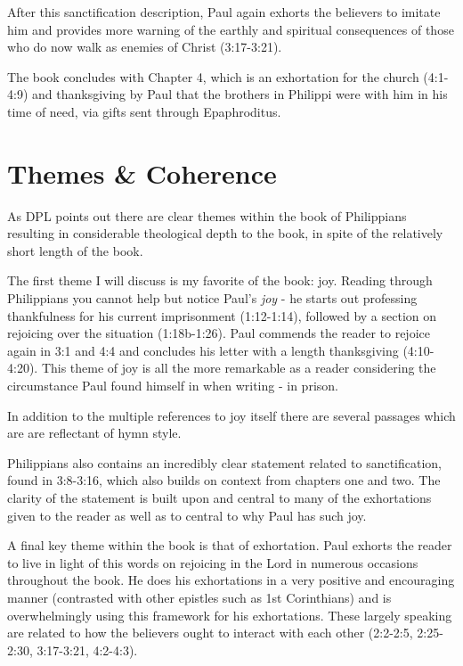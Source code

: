\documentclass[12pt]{turabian-researchpaper}
\begin{document}
After this sanctification description, Paul again exhorts the believers to imitate him and provides more warning of the earthly and spiritual consequences of those who do now walk as enemies of Christ (3:17-3:21).

The book concludes with Chapter 4, which is an exhortation for the church (4:1-4:9) and thanksgiving by Paul that the brothers in Philippi were with him in his time of need, via gifts sent through Epaphroditus.

\section{Themes \& Coherence}

As DPL points out there are clear themes within the book of Philippians resulting in considerable theological depth to the book, in spite of the relatively short length of the book.\autocite[pg. 712]{hawthorne2009dictionary}

The first theme I will discuss is my favorite of the book: joy. Reading through Philippians you cannot help but notice Paul's \textit{joy} - he starts out professing thankfulness for his current imprisonment (1:12-1:14), followed by a section on rejoicing over the situation (1:18b-1:26). Paul commends the reader to rejoice again in 3:1 and 4:4 and concludes his letter with a length thanksgiving (4:10-4:20). This theme of joy is all the more remarkable as a reader considering the circumstance Paul found himself in when writing - in prison.

In addition to the multiple references to joy itself there are several passages which are are reflectant of hymn style.\autocite{hawthorne2009dictionary}

Philippians also contains an incredibly clear statement related to sanctification, found in 3:8-3:16\autocite[pg. 713]{hawthorne2009dictionary}, which also builds on context from chapters one and two. The clarity of the statement is built upon and central to many of the exhortations given to the reader as well as to central to why Paul has such joy.

A final key theme within the book is that of exhortation. Paul exhorts the reader to live in light of this words on rejoicing in the Lord in numerous occasions throughout the book. He does his exhortations in a very positive and encouraging manner (contrasted with other epistles such as 1st Corinthians) and is overwhelmingly using this framework for his exhortations. These largely speaking are related to how the believers ought to interact with each other (2:2-2:5, 2:25-2:30, 3:17-3:21, 4:2-4:3). 
\end{document}
